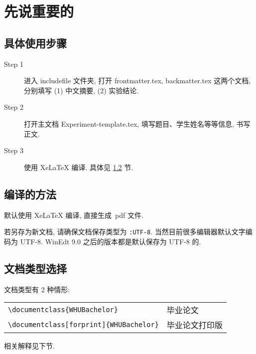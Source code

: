 \chapter{先说重要的}
 
 \section{具体使用步骤}

 \begin{description}

  \item[Step 1]  进入 includefile 文件夹,  打开 frontmatter.tex, backmatter.tex 这两个文档,
        分别填写 (1) 中文摘要, (2) 实验结论.

  \item[Step 2]  打开主文档 Experiment-template.tex, 填写题目、学生姓名等等信息, 书写正文.

  \item[Step 3]  使用 XeLaTeX 编译. 具体见 \ref{sec-compile} 节.


\end{description}



\section{编译的方法}\label{sec-compile}

默认使用 XeLaTeX 编译, 直接生成~pdf 文件.

若另存为新文档, 请确保文档保存类型为 \verb|:UTF-8|. 当然目前很多编辑器默认文字编码为 UTF-8.
WinEdt 9.0 之后的版本都是默认保存为 UTF-8 的.


%





\section{文档类型选择}

{\textbf{}}

文档类型有 2 种情形:

\begin{table}[ht]\centering
\begin{tabular}{ll}
\hline
   \verb|\documentclass{WHUBachelor}|                     &  毕业论文 \\
   \verb|\documentclass[forprint]{WHUBachelor}|        &  毕业论文打印版 \\
\hline
\end{tabular}
\end{table}
相关解释见下节.


